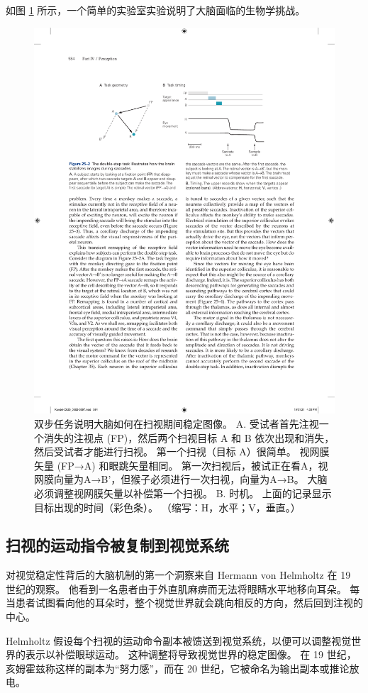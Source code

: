 如图 \ref{fig:25_2} 所示，一个简单的实验室实验说明了大脑面临的生物学挑战。

\begin{figure}[htbp]
	\centering
	\includegraphics[width=0.75\linewidth]{chap25/fig_25_2}
	\caption{双步任务说明大脑如何在扫视期间稳定图像。 A. 受试者首先注视一个消失的注视点 (FP)，然后两个扫视目标 A 和 B 依次出现和消失，然后受试者才能进行扫视。 第一个扫视（目标 A）很简单。 视网膜矢量 (FP→A) 和眼跳矢量相同。 第一次扫视后，被试正在看A，视网膜向量为A→B'，但猴子必须进行一次扫视，向量为A→B。 大脑必须调整视网膜矢量以补偿第一个扫视。 B. 时机。 上面的记录显示目标出现的时间（彩色条）。 （缩写：H，水平；V，垂直。）}
	\label{fig:25_2}
\end{figure}

\subsection{扫视的运动指令被复制到视觉系统}

对视觉稳定性背后的大脑机制的第一个洞察来自 Hermann von Helmholtz 在 19 世纪的观察。 他看到一名患者由于外直肌麻痹而无法将眼睛水平地移向耳朵。 每当患者试图看向他的耳朵时，整个视觉世界就会跳向相反的方向，然后回到注视的中心。

Helmholtz 假设每个扫视的运动命令副本被馈送到视觉系统，以便可以调整视觉世界的表示以补偿眼球运动。 这种调整将导致视觉世界的稳定图像。 在 19 世纪，亥姆霍兹称这样的副本为“努力感”，而在 20 世纪，它被命名为输出副本或推论放电。

